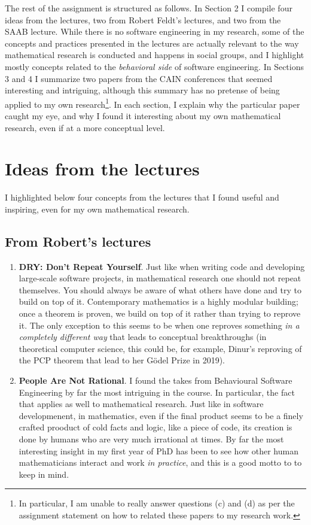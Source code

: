 The rest of the assignment is structured as follows. In Section 2 I compile four ideas from the lectures, two from Robert Feldt's lectures, and two from the SAAB lecture. While there is no software engineering in my research, some of the concepts and practices presented in the lectures are actually relevant to the way mathematical research is conducted and happens in social groups, and I highlight mostly concepts related to the \emph{behavioral side} of software engineering. In Sections 3 and 4 I summarize two papers from the CAIN conferences that seemed interesting and intriguing, although this summary has no pretense of being applied to my own research\footnote{In particular, I am unable to really answer questions (c) and (d) as per the assignment statement on how to related these papers to my research work.}. In each section, I explain why the particular paper caught my eye, and why I found it interesting about my own mathematical research, even if at a more conceptual level.


\section{Ideas from the lectures}

I highlighted below four concepts from the lectures that I found useful and inspiring, even for my own mathematical research.

\subsection*{From Robert's lectures}

\begin{enumerate}
    \item \textbf{DRY: Don't Repeat Yourself}. Just like when writing code and developing large-scale software projects, in mathematical research one should not repeat themselves. You should always be aware of what others have done and try to build on top of it. Contemporary mathematics is a highly modular building; once a theorem is proven, we build on top of it rather than trying to reprove it. The only exception to this seems to be when one reproves something \emph{in a completely different way} that leads to conceptual breakthroughs (in theoretical computer science, this could be, for example, Dinur's reproving of the PCP theorem \cite{dinur2007pcp} that lead to her Gödel Prize in 2019).
    \item \textbf{People Are Not Rational}.     I found the takes from Behavioural Software Engineering by far the most intriguing in the course. In particular, the fact that  applies as well to mathematical research. Just like in software developmenent, in mathematics, even if the final product seems to be a finely crafted prooduct of cold facts and logic, like a piece of code, its creation is done by humans who are very much irrational at times. By far the most interesting insight in my first year of PhD has been to see how other human mathematicians interact and work \emph{in practice}, and this is a good motto to to keep in mind.
\end{enumerate}
